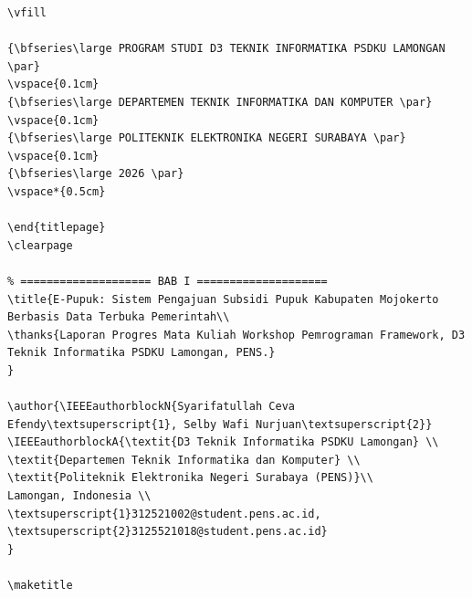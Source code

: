 \documentclass[conference]{IEEEtran}
\begin{document}
\begin{lstlisting}
\vfill

{\bfseries\large PROGRAM STUDI D3 TEKNIK INFORMATIKA PSDKU LAMONGAN \par}
\vspace{0.1cm}
{\bfseries\large DEPARTEMEN TEKNIK INFORMATIKA DAN KOMPUTER \par}
\vspace{0.1cm}
{\bfseries\large POLITEKNIK ELEKTRONIKA NEGERI SURABAYA \par}
\vspace{0.1cm}
{\bfseries\large 2026 \par}
\vspace*{0.5cm}

\end{titlepage}
\clearpage

% ==================== BAB I ====================
\title{E-Pupuk: Sistem Pengajuan Subsidi Pupuk Kabupaten Mojokerto Berbasis Data Terbuka Pemerintah\\
\thanks{Laporan Progres Mata Kuliah Workshop Pemrograman Framework, D3 Teknik Informatika PSDKU Lamongan, PENS.}
}

\author{\IEEEauthorblockN{Syarifatullah Ceva Efendy\textsuperscript{1}, Selby Wafi Nurjuan\textsuperscript{2}}
\IEEEauthorblockA{\textit{D3 Teknik Informatika PSDKU Lamongan} \\
\textit{Departemen Teknik Informatika dan Komputer} \\
\textit{Politeknik Elektronika Negeri Surabaya (PENS)}\\
Lamongan, Indonesia \\
\textsuperscript{1}312521002@student.pens.ac.id, \textsuperscript{2}3125521018@student.pens.ac.id}
}

\maketitle


\end{lstlisting}
\end{document}
